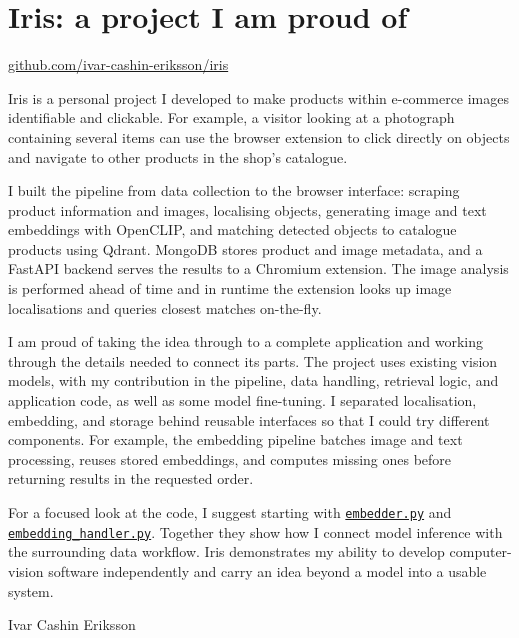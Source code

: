 \documentclass[11pt,a4paper]{moderncv}
\begin{document}
\makecvtitle
\section*{Iris: a project I am proud of}

\href{https://github.com/ivar-cashin-eriksson/iris}{github.com/ivar-cashin-eriksson/iris}

\vspace{1em}
Iris is a personal project I developed to make products within e-commerce images identifiable and clickable. For example, a visitor looking at a photograph containing several items can use the browser extension to click directly on objects and navigate to other products in the shop's catalogue.

\vspace{4pt}
\hspace*{2em}
I built the pipeline from data collection to the browser interface: scraping product information and images, localising objects, generating image and text embeddings with OpenCLIP, and matching detected objects to catalogue products using Qdrant. MongoDB stores product and image metadata, and a FastAPI backend serves the results to a Chromium extension. The image analysis is performed ahead of time and in runtime the extension looks up image localisations and queries closest matches on-the-fly.

\vspace{4pt}
\hspace*{2em}
I am proud of taking the idea through to a complete application and working through the details needed to connect its parts. The project uses existing vision models, with my contribution in the pipeline, data handling, retrieval logic, and application code, as well as some model fine-tuning. I separated localisation, embedding, and storage behind reusable interfaces so that I could try different components. For example, the embedding pipeline batches image and text processing, reuses stored embeddings, and computes missing ones before returning results in the requested order.

\vspace{4pt}
\hspace*{2em}
For a focused look at the code, I suggest starting with \href{https://github.com/ivar-cashin-eriksson/iris/blob/main/iris/embedding_pipeline/embedder.py}{\texttt{embedder.py}} and \href{https://github.com/ivar-cashin-eriksson/iris/blob/main/iris/embedding_pipeline/embedding_handler.py}{\texttt{embedding\_handler.py}}. Together they show how I connect model inference with the surrounding data workflow. Iris demonstrates my ability to develop computer-vision software independently and carry an idea beyond a model into a usable system.

\vspace{2em}
Ivar Cashin Eriksson
\end{document}
